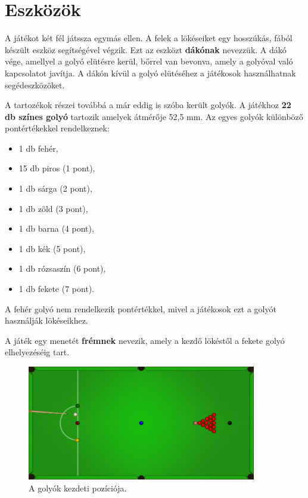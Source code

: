\section{Eszközök}
A játékot két fél játssza egymás ellen. A felek a lökéseiket egy hosszúkás, fából készült eszköz segítségével végzik. Ezt az eszközt \textbf{dákónak} nevezzük. A dákó vége, amellyel a golyó elütésre kerül, bőrrel van bevonva, amely a golyóval való kapcsolatot javítja. A dákón kívül a golyó elütéséhez a játékosok használhatnak segédeszközöket.
\par A tartozékok részei továbbá a már eddig is szóba került golyók. A játékhoz \textbf{22 db színes golyó} tartozik amelyek átmérője 52,5 mm.\cite{snooker_rules}
\newline Az egyes golyók különböző pontértékekkel rendelkeznek:\cite{snooker_rules}
\begin{itemize}
    \setlength\itemsep{-2pt}
    \item 1 db fehér,
    \item 15 db piros (1 pont),
    \item 1 db sárga (2 pont),
    \item 1 db zöld (3 pont),
    \item 1 db barna (4 pont),
    \item 1 db kék (5 pont),
    \item 1 db rózsaszín (6 pont),
    \item 1 db fekete (7 pont).
\end{itemize}
A fehér golyó nem rendelkezik pontértékkel, mivel a játékosok ezt a golyót használják lökéseikhez.
\par A játék egy menetét \textbf{frémnek} nevezik, amely a kezdő lökéstől a fekete golyó elhelyezéséig tart.\cite{snooker_rules}
\begin{figure}[!ht]
    \centering
    \includegraphics[width=100mm, keepaspectratio]{figures/starting_position.png}
    \caption{A golyók kezdeti pozíciója.}
    \label{fig:kezdeti_pozicio}
\end{figure}

